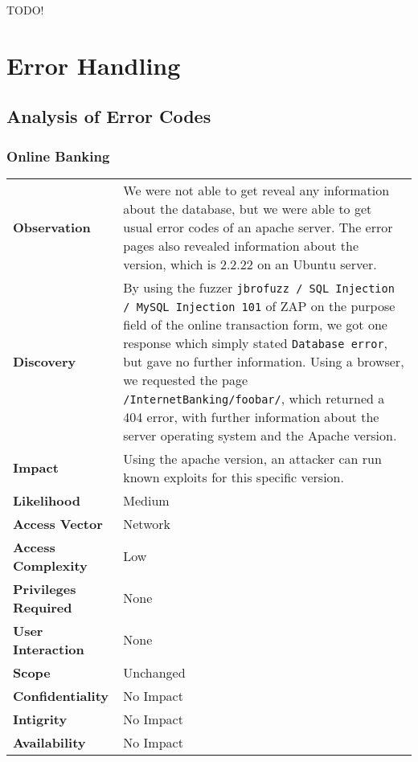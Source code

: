 TODO!

\clearpage



\section{Error Handling}

\subsection{Analysis of Error Codes}
\subsubsection*{Online Banking}
\begin{tabular}{l|p{10cm}}

\textbf{Observation} & We were not able to get reveal any information about the database, but we were able to get usual error codes of an apache server. The error pages also revealed information about the version, which is 2.2.22 on an Ubuntu server. \\
\textbf{Discovery} & By using the fuzzer \texttt{jbrofuzz / SQL Injection / MySQL Injection 101} of ZAP on the purpose field of the online transaction form, we got one response which simply stated \texttt{Database error}, but gave no further information. Using a browser, we requested the page \texttt{/InternetBanking/foobar/}, which returned a 404 error, with further information about the server operating system and the Apache version. \\
\textbf{Impact} & Using the apache version, an attacker can run known exploits for this specific version. \\
\textbf{Likelihood} & Medium \\
\textbf{Access Vector} & Network \\
\textbf{Access Complexity} & Low \\
\textbf{Privileges Required} & None \\
\textbf{User Interaction} & None \\
\textbf{Scope} & Unchanged \\
\textbf{Confidentiality} & No Impact \\
\textbf{Intigrity} & No Impact \\
\textbf{Availability} & No Impact \\
\end{tabular}


